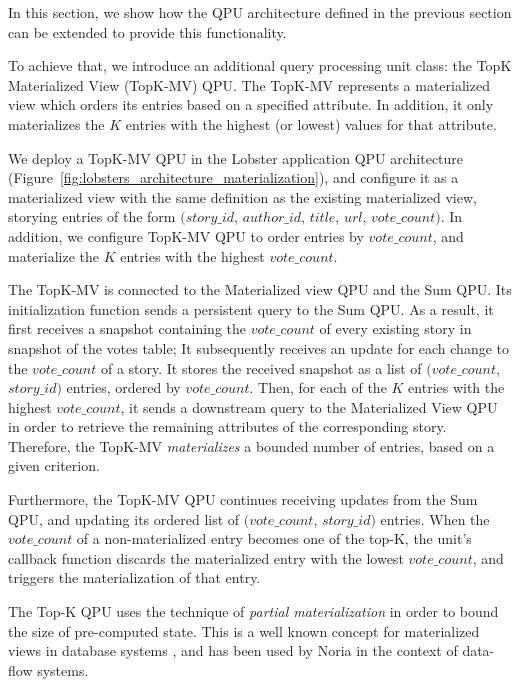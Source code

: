 In this section, we show how the QPU architecture defined in the previous section can be extended to provide this
functionality.

To achieve that, we introduce an additional query processing unit class: the TopK Materialized View (TopK-MV) QPU.
The TopK-MV represents a materialized view which orders its entries based on a specified attribute.
In addition, it only materializes the $K$ entries with the highest (or lowest) values for that attribute.

We deploy a TopK-MV QPU in the Lobster application QPU architecture (Figure~\ref{fig:lobsters_architecture_materialization}),
and configure it as a materialized view with the same definition as the existing materialized view,
storying entries of the form $(story\_id$, $author\_id$, $title$, $url$, $vote\_count)$.
In addition, we configure TopK-MV QPU to order entries by $vote\_count$, and materialize the $K$ entries with the highest $vote\_count$.

The TopK-MV is connected to the Materialized view QPU and the Sum QPU.
Its initialization function sends a persistent query to the Sum QPU.
As a result, it first receives a snapshot containing the $vote\_count$ of every existing story in snapshot of the votes table;
It subsequently receives an update for each change to the $vote\_count$ of a story.
It stores the received snapshot as a list of $(vote\_count$, $story\_id)$ entries, ordered by $vote\_count$.
Then, for each of the $K$ entries with the highest $vote\_count$,
it sends a downstream query to the Materialized View QPU in order to retrieve the remaining attributes of the corresponding story.
Therefore, the TopK-MV \textit{materializes} a bounded number of entries, based on a given criterion.

Furthermore, the TopK-MV QPU continues receiving updates from the Sum QPU, and updating its
ordered list of $(vote\_count$, $story\_id)$ entries.
When the $vote\_count$ of a non-materialized entry becomes one of the top-K,
the unit's callback function discards the materialized entry with the lowest $vote\_count$,
and triggers the materialization of that entry.

The Top-K QPU uses the technique of \textit{partial materialization} in order to bound the size of pre-computed state.
This is a well known concept for materialized views in database systems \cite{zhou:partiallymaterialized, zhou:dynamicmaterialized},
and has been used by Noria \cite{gjengset:noria} in the context of data-flow systems.

